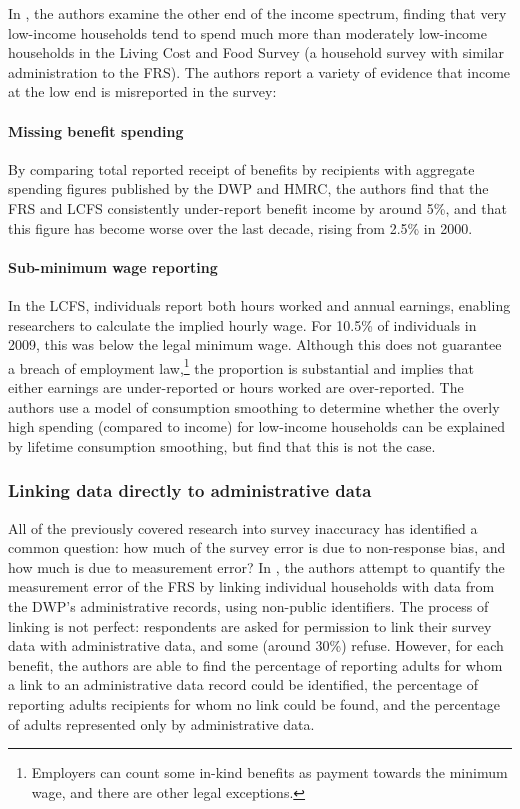 \documentclass[10pt,journal,compsoc]{IEEEtran}
\begin{document}
In \cite{brewer_low_income_coverage}, the authors examine the other end of the income spectrum, finding that very low-income households tend to spend much more than moderately low-income households in the Living Cost and Food Survey (a household survey with similar administration to the FRS). The authors report a variety of evidence that income at the low end is misreported in the survey:

\paragraph{Missing benefit spending} By comparing total reported receipt of benefits by recipients with aggregate spending figures published by the DWP and HMRC, the authors find that the FRS and LCFS consistently under-report benefit income by around 5\%, and that this figure has become worse over the last decade, rising from 2.5\% in 2000.

\paragraph{Sub-minimum wage reporting} In the LCFS, individuals report both hours worked and annual earnings, enabling researchers to calculate the implied hourly wage. For 10.5\% of individuals in 2009, this was below the legal minimum wage. Although this does not guarantee a breach of employment law,\footnote{Employers can count some in-kind benefits as payment towards the minimum wage, and there are other legal exceptions.} the proportion is substantial and implies that either earnings are under-reported or hours worked are over-reported. The authors use a model of consumption smoothing to determine whether the overly high spending (compared to income) for low-income households can be explained by lifetime consumption smoothing, but find that this is not the case.

\subsubsection{Linking data directly to administrative data}

All of the previously covered research into survey inaccuracy has identified a common question: how much of the survey error is due to non-response bias, and how much is due to measurement error? In \cite{dwp_110}, the authors attempt to quantify the measurement error of the FRS by linking individual households with data from the DWP's administrative records, using non-public identifiers. The process of linking is not perfect: respondents are asked for permission to link their survey data with administrative data, and some (around 30\%) refuse. However, for each benefit, the authors are able to find the percentage of reporting adults for whom a link to an administrative data record could be identified, the percentage of reporting adults recipients for whom no link could be found, and the percentage of adults represented only by administrative data. 
\end{document}
